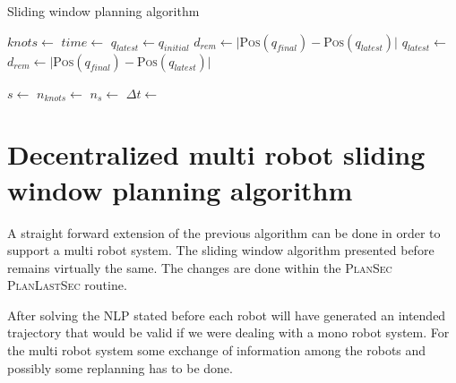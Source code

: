 \documentclass[eprint]{actapoly}
\begin{document}
\begin{algorithm}
    \caption{Sliding window planning algorithm\label{cod:algo}}
    \label{swpa}
    \begin{algorithmic}[1] %
	    \State $knots \gets $
	    \State $time \gets $
	    \State $q_{latest} \gets q_{initial}$
	    \State $d_{rem} \gets |${\scshape Pos}$(q_{final}) - ${\scshape Pos}$(q_{latest})|$
		\State $q_{latest} \gets $
		\State $d_{rem} \gets |${\scshape Pos}$(q_{final}) - ${\scshape Pos}$(q_{latest})|$
		
	    \EndWhile\label{planningwhile}
	    \State $s \gets $
	    \State $n_{knots} \gets $
	    \State $n_{s} \gets $
	    \State $\Delta t \gets $
	    
        \EndProcedure
    \end{algorithmic}
\end{algorithm}



\section{Decentralized multi robot sliding window planning algorithm}



A straight forward extension of the previous algorithm can be done in order to
support a multi robot system. The sliding window algorithm presented before remains
virtually the same. The changes are done within the {\scshape PlanSec} {\scshape PlanLastSec} routine.

After solving the NLP stated before each robot will have generated an intended trajectory that would be valid
if we were dealing with a mono robot system.
For the multi robot system some exchange of information among the robots and possibly some replanning has to be done.
\end{document}

